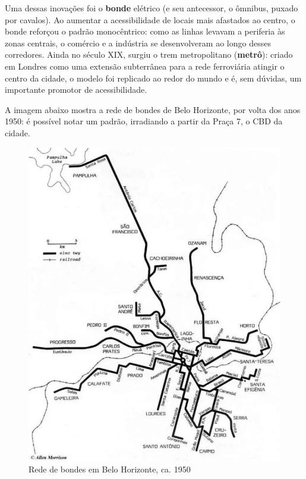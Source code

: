 \documentclass[
  12pt,
  a4paper,
]{article}
\begin{document}
Uma dessas inovações foi o \textbf{bonde} elétrico (e seu antecessor, o
ômnibus, puxado por cavalos). Ao aumentar a acessibilidade de locais
mais afastados ao centro, o bonde reforçou o padrão monocêntrico: como
as linhas levavam a periferia às zonas centrais, o comércio e a
indústria se desenvolveram ao longo desses corredores. Ainda no século
XIX, surgiu o trem metropolitano (\textbf{metrô}): criado em Londres
como uma extensão subterrânea para a rede ferroviária atingir o centro
da cidade, o modelo foi replicado ao redor do mundo e é, sem dúvidas, um
importante promotor de acessibilidade.

A imagem abaixo mostra a rede de bondes de Belo Horizonte, por volta dos
anos 1950: é possível notar um padrão, irradiando a partir da Praça 7, o
CBD da cidade.

\begin{figure}

{\centering \includegraphics[width=10.04in,height=0.4\textheight]{src/images/bonde_bh} 

}

\caption{\label{fig:bonde} Rede de bondes em Belo Horizonte, ca. 1950}\label{fig:bonde}
\end{figure}
\end{document}
